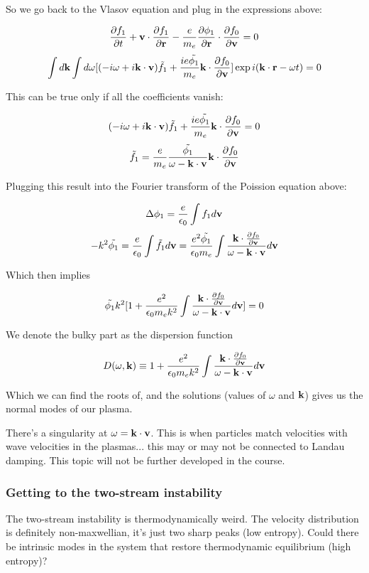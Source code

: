 So we go back to the Vlasov equation and plug in the expressions above:

\[\frac{\partial f_1}{\partial t} + \mathbf{v} \cdot \frac{\partial f_1}{\partial \mathbf{r}} - \frac{e}{m_e}\frac{\partial \phi_1}{\partial \mathbf{r}} \cdot \frac{\partial f_0}{\partial \mathbf{v}} = 0\]
\[\int d\mathbf{k} \int d\omega [(-i\omega + i \mathbf{k} \cdot \mathbf{v}) \tilde{f_1} + \frac{i e \tilde{\phi_1}}{m_e} \mathbf{k} \cdot \frac{\partial f_0}{\partial \mathbf{v}}]\exp{i(\ensuremath{\mathbf{k}} \cdot \ensuremath{\mathbf{r}} - \omega t)} = 0 \]

This can be true only if all the coefficients vanish:

\[ (-i\omega + i \mathbf{k} \cdot \mathbf{v}) \tilde{f_1} + \frac{i e \tilde{\phi_1}}{m_e} \mathbf{k} \cdot \frac{\partial f_0}{\partial \mathbf{v}} = 0 \]
\[ \tilde{f_1} = \frac{e}{m_e} \frac{\tilde{\phi_1}}{\omega - \mathbf{k} \cdot \mathbf{v}} \mathbf{k} \cdot \frac{\partial f_0}{\partial \mathbf{v}} \]

Plugging this result into the Fourier transform of the Poission equation above:

\[ \Delta \phi_1 = \frac{e}{\epsilon_0} \int f_1 d\mathbf{v} \]
\[ -k^2 \tilde{\phi_1} = \frac{e}{\epsilon_0} \int \tilde{f_1} d\mathbf{v} =\frac{e^2 \tilde{\phi_1}}{\epsilon_0 m_e} \int \frac{\mathbf{k} \cdot \frac{\partial f_0}{\partial \mathbf{v}}}{\omega - \mathbf{k} \cdot \mathbf{v}} d\mathbf{v} \]

Which then implies

\[ \tilde{\phi_1} k^2 [ 1+ \frac{e^2}{\epsilon_0 m_e k^2} \int \frac{\mathbf{k} \cdot \frac{\partial f_0}{\partial \mathbf{v}}}{\omega - \mathbf{k} \cdot \mathbf{v}} d\mathbf{v} ] =0 \]

We denote the bulky part as the dispersion function

\[ D(\omega, \mathbf{k}) \equiv 1+ \frac{e^2}{\epsilon_0 m_e k^2} \int \frac{\mathbf{k} \cdot \frac{\partial f_0}{\partial \mathbf{v}}}{\omega - \mathbf{k} \cdot \mathbf{v}} d\mathbf{v} \]

Which we can find the roots of, and the solutions (values of $\omega$ and $\mathbf{k}$) gives us the normal modes of our plasma.

There's a singularity at $\omega = \mathbf{k} \cdot \mathbf{v}$. This is when particles match velocities with wave velocities in the plasmas... this may or may not be connected to Landau damping. This topic will not be further developed in the course.

\subsubsection{Getting to the two-stream instability}

The two-stream instability is thermodynamically weird. The velocity distribution is definitely non-maxwellian, it's just two sharp peaks (low entropy). Could there be intrinsic modes in the system that restore thermodynamic equilibrium (high entropy)?

